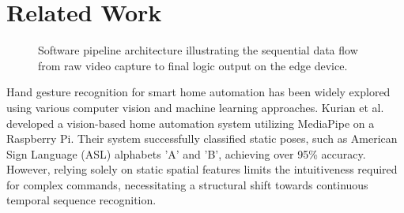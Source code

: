 \section{Related Work}

\begin{figure}[!t]
\centering
{}
\caption{Software pipeline architecture illustrating the sequential data flow from raw video capture to final logic output on the edge device.}
\label{fig:software_pipeline}
\end{figure}



Hand gesture recognition for smart home automation has been widely explored using various computer vision and machine learning approaches. Kurian et al. \cite{kurian2023visual} developed a vision-based home automation system utilizing MediaPipe on a Raspberry Pi. Their system successfully classified static poses, such as American Sign Language (ASL) alphabets 'A' and 'B', achieving over 95\% accuracy. However, relying solely on static spatial features limits the intuitiveness required for complex commands, necessitating a structural shift towards continuous temporal sequence recognition.

